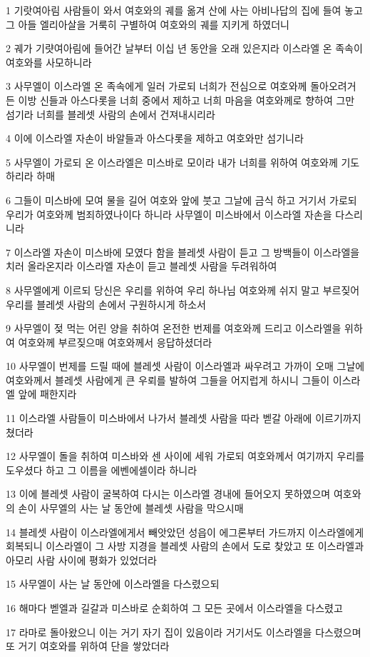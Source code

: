 \par 1 기랏여아림 사람들이 와서 여호와의 궤를 옮겨 산에 사는 아비나답의 집에 들여 놓고 그 아들 엘리아살을 거룩히 구별하여 여호와의 궤를 지키게 하였더니
\par 2 궤가 기럇여아림에 들어간 날부터 이십 년 동안을 오래 있은지라 이스라엘 온 족속이 여호와를 사모하니라
\par 3 사무엘이 이스라엘 온 족속에게 일러 가로되 너희가 전심으로 여호와께 돌아오려거든 이방 신들과 아스다롯을 너희 중에서 제하고 너희 마음을 여호와께로 향하여 그만 섬기라 너희를 블레셋 사람의 손에서 건져내시리라
\par 4 이에 이스라엘 자손이 바알들과 아스다롯을 제하고 여호와만 섬기니라
\par 5 사무엘이 가로되 온 이스라엘은 미스바로 모이라 내가 너희를 위하여 여호와께 기도하리라 하매
\par 6 그들이 미스바에 모여 물을 길어 여호와 앞에 붓고 그날에 금식 하고 거기서 가로되 우리가 여호와께 범죄하였나이다 하니라 사무엘이 미스바에서 이스라엘 자손을 다스리니라
\par 7 이스라엘 자손이 미스바에 모였다 함을 블레셋 사람이 듣고 그 방백들이 이스라엘을 치러 올라온지라 이스라엘 자손이 듣고 블레셋 사람을 두려워하여
\par 8 사무엘에게 이르되 당신은 우리를 위하여 우리 하나님 여호와께 쉬지 말고 부르짖어 우리를 블레셋 사람의 손에서 구원하시게 하소서
\par 9 사무엘이 젖 먹는 어린 양을 취하여 온전한 번제를 여호와께 드리고 이스라엘을 위하여 여호와께 부르짖으매 여호와께서 응답하셨더라
\par 10 사무엘이 번제를 드릴 때에 블레셋 사람이 이스라엘과 싸우려고 가까이 오매 그날에 여호와께서 블레셋 사람에게 큰 우뢰를 발하여 그들을 어지럽게 하시니 그들이 이스라엘 앞에 패한지라
\par 11 이스라엘 사람들이 미스바에서 나가서 블레셋 사람을 따라 벧갈 아래에 이르기까지 쳤더라
\par 12 사무엘이 돌을 취하여 미스바와 센 사이에 세워 가로되 여호와께서 여기까지 우리를 도우셨다 하고 그 이름을 에벤에셀이라 하니라
\par 13 이에 블레셋 사람이 굴복하여 다시는 이스라엘 경내에 들어오지 못하였으며 여호와의 손이 사무엘의 사는 날 동안에 블레셋 사람을 막으시매
\par 14 블레셋 사람이 이스라엘에게서 빼앗았던 성읍이 에그론부터 가드까지 이스라엘에게 회복되니 이스라엘이 그 사방 지경을 블레셋 사람의 손에서 도로 찾았고 또 이스라엘과 아모리 사람 사이에 평화가 있었더라
\par 15 사무엘이 사는 날 동안에 이스라엘을 다스렸으되
\par 16 해마다 벧엘과 길갈과 미스바로 순회하여 그 모든 곳에서 이스라엘을 다스렸고
\par 17 라마로 돌아왔으니 이는 거기 자기 집이 있음이라 거기서도 이스라엘을 다스렸으며 또 거기 여호와를 위하여 단을 쌓았더라


